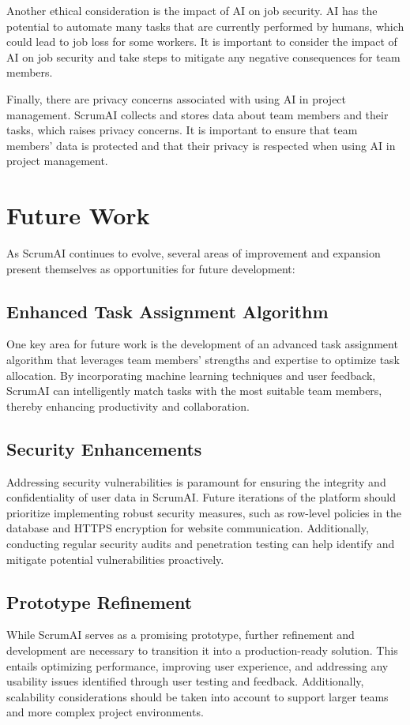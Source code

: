 \documentclass[conference]{IEEEtran}
\begin{document}
Another ethical consideration is the impact of AI on job security. AI has the potential to automate many tasks that are currently performed by humans, which could lead to job loss for some workers. It is important to consider the impact of AI on job security and take steps to mitigate any negative consequences for team members.

Finally, there are privacy concerns associated with using AI in project management. ScrumAI collects and stores data about team members and their tasks, which raises privacy concerns. It is important to ensure that team members' data is protected and that their privacy is respected when using AI in project management.


\section{Future Work}
As ScrumAI continues to evolve, several areas of improvement and expansion present themselves as opportunities for future development:

\subsection{Enhanced Task Assignment Algorithm}
One key area for future work is the development of an advanced task assignment algorithm that leverages team members' strengths and expertise to optimize task allocation. By incorporating machine learning techniques and user feedback, ScrumAI can intelligently match tasks with the most suitable team members, thereby enhancing productivity and collaboration.

\subsection{Security Enhancements}
Addressing security vulnerabilities is paramount for ensuring the integrity and confidentiality of user data in ScrumAI. Future iterations of the platform should prioritize implementing robust security measures, such as row-level policies in the database and HTTPS encryption for website communication. Additionally, conducting regular security audits and penetration testing can help identify and mitigate potential vulnerabilities proactively.

\subsection{Prototype Refinement}
While ScrumAI serves as a promising prototype, further refinement and development are necessary to transition it into a production-ready solution. This entails optimizing performance, improving user experience, and addressing any usability issues identified through user testing and feedback. Additionally, scalability considerations should be taken into account to support larger teams and more complex project environments.
\end{document}
